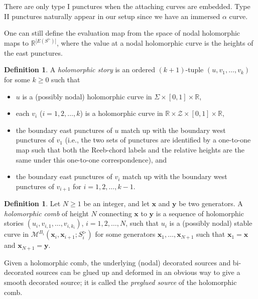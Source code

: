 \documentclass{amsart}
\theoremstyle{definition}
\newtheorem{defn}[thm]{Definition}
\theoremstyle{remark}
\numberwithin{equation}{section}
\numberwithin{equation}{section} \makeatletter
\begin{document}
There are only type I punctures when the attaching curves are embedded. Type II punctures naturally appear in our setup since we have an immersed $\alpha$ curve. 

One can still define the evaluation map from the space of nodal holomorphic maps to $\mathbb{R}^{|E(S^\triangleright)|}$, where the value at a nodal holomorphic curve is the heights of the east punctures. 
\begin{defn}
A \emph{holomorphic story} is an ordered $(k+1)$-tuple $(u,v_{1},\ldots,v_{k})$ for some $k\geq 0$ such that 
\begin{itemize}
\item[(1)]$u$ is a (possibly nodal) holomorphic curve in $\Sigma\times [0,1]\times\mathbb{R}$,
\item[(2)]each $v_i$ ($i=1,2,\ldots,k$) is a holomorphic curve in $\mathbb{R}\times \mathcal{Z}\times [0,1]\times \mathbb{R}$,
\item[(3)]the boundary east punctures of $u$ match up with the boundary west punctures of $v_1$ (i.e., the two sets of punctures are identified by a one-to-one map such that both the Reeb-chord labels and the relative heights are the same under this one-to-one correspondence), and
\item[(4)]the boundary east punctures of $v_i$ match up with the boundary west punctures of $v_{i+1}$ for $i=1,2,\ldots,k-1$.
\end{itemize}
\end{defn}

\begin{defn}\label{Definition, holomorphic comb}
Let $N\geq 1$ be an integer, and let $\bm{x}$ and $\bm{y}$ be two generators. A \emph{holomorphic comb} of height $N$ connecting $\bm{x}$ to $\bm{y}$ is a sequence of holomorphic stories $(u_i,v_{i,1},\ldots,v_{i,k_i})$, $i=1,2,\ldots , N$, such that $u_i$ is a (possibly nodal) stable curve in $\mathcal{M}^{B_i}(\bm{x}_i,{\bm{x}_{i+1}};S_i^\triangleright)$ for some generators ${\bm{x}_1},\ldots,{\bm{x}_{N+1}}$ such that $\bm{x}_1=\bm{x}$ and $\bm{x}_{N+1}=\bm{y}$. 
\end{defn}

Given a holomorphic comb, the underlying (nodal) decorated sources and bi-decorated sources can be glued up and deformed in an obvious way to give a smooth decorated source; it is called the \emph{preglued source} of the holomorphic comb.
\end{document}
